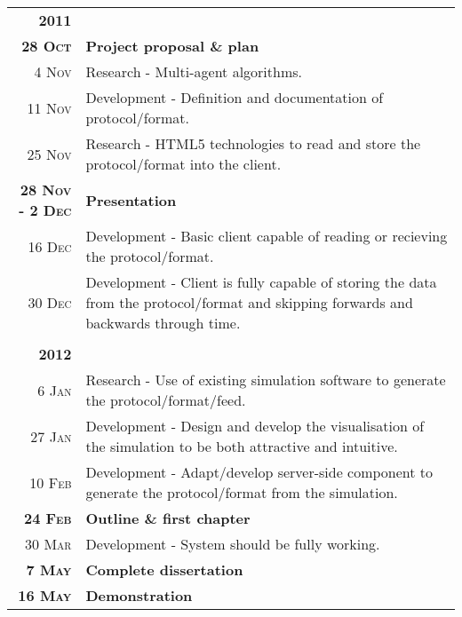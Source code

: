 \documentclass[a4paper]{article}
\begin{document}
			\begin{tabular}{r p{11cm}}

				\textbf{2011}\\
				\textbf{28 \textsc{Oct}}						& \textbf{Project proposal \& plan} \\
				4 \textsc{Nov}									& Research - Multi-agent algorithms. \\
				11 \textsc{Nov}									& Development - Definition and documentation of protocol/format. \\
				25 \textsc{Nov}									& Research - HTML5 technologies to read and store the protocol/format into the client. \\
				\textbf{28 \textsc{Nov} - 2 \textsc{Dec}}		& \textbf{Presentation} \\
				16 \textsc{Dec}									& Development - Basic client capable of reading or recieving the protocol/format. \\
				30 \textsc{Dec}									& Development - Client is fully capable of storing the data from the protocol/format and skipping forwards and backwards through time. \\

				\\

				\textbf{2012}\\
				6 \textsc{Jan}									& Research - Use of existing simulation software to generate the protocol/format/feed. \\
				27 \textsc{Jan}									& Development - Design and develop the visualisation of the simulation to be both attractive and intuitive. \\
				10 \textsc{Feb}									& Development - Adapt/develop server-side component to generate the protocol/format from the simulation. \\
				\textbf{24 \textsc{Feb}}						& \textbf{Outline \& first chapter} \\
				30 \textsc{Mar}									& Development - System should be fully working. \\
				\textbf{7 \textsc{May}}							& \textbf{Complete dissertation} \\
				\textbf{16 \textsc{May}}						& \textbf{Demonstration} \\

			\end{tabular}
\end{document}
